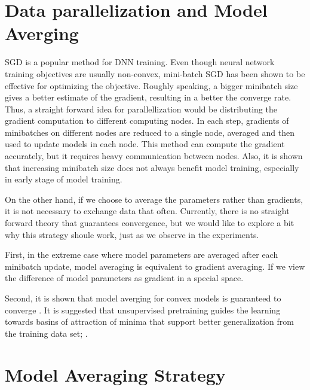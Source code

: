 \documentclass{article}
\begin{document}
\section{Data parallelization and Model Averging}
SGD is a popular method for DNN training. Even though neural network training objectives are usually non-convex, 
mini-batch SGD has been shown to be effective for optimizing the objective\cite{seide2011conversational}. 
Roughly speaking, a bigger minibatch size gives a better estimate of the gradient, resulting in a better the converge rate. 
Thus, a straight forward idea for parallellization would be distributing the gradient computation to different computing
nodes. In each step, gradients of minibatches on different nodes are reduced to a single node, averaged and then used to 
update models in each node. This method can compute the gradient accurately, but it requires heavy communication between nodes.
Also, it is shown that increasing minibatch size does not always benefit model training\cite{}, especially in early stage 
of model training.

On the other hand, if we choose to average the parameters rather than gradients, it is not necessary to exchange data that often. 
Currently, there is no straight forward theory that guarantees convergence, but we would like to explore a bit why this strategy 
shoule work, just as we observe in the experiments.

First, in the extreme case where model parameters are averaged after each minibatch update, model averaging is equivalent to 
gradient averaging. If we view the difference of model parameters as gradient in a special space.

Second, it is shown that model averging for convex models is guaranteed to converge \cite{mcdonald2010distributed,mcdonald2009efficient}.
It is suggested that unsupervised pretraining guides the learning towards basins of attraction of minima that support better generalization
from the training data set; \cite{erhan2010does}.

\section{Model Averaging Strategy}
\end{document}
